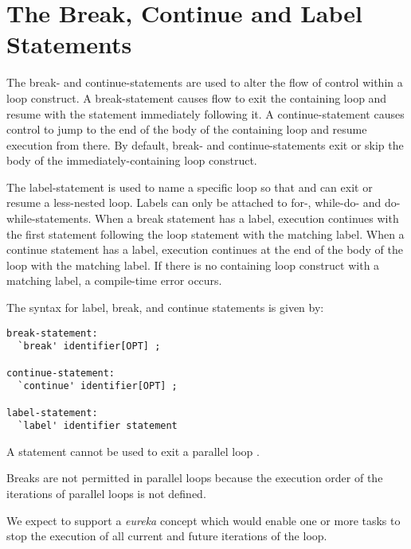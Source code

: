\pagebreak
\section{The Break, Continue and Label Statements}
\label{Label_Break_Continue}

The break- and continue-statements are used to alter the flow of control within a
loop construct.  A break-statement causes flow to exit the containing loop and
resume with the statement immediately following it.  A continue-statement causes
control to jump to the end of the body of the containing loop and resume
execution from there.  By default, break- and continue-statements exit
or skip the body of the immediately-containing loop construct.

The label-statement is used to name a specific loop so that 
and  can exit or resume a less-nested loop.
Labels can only be attached to for-, while-do- and do-while-statements.
When a break statement has a label, execution continues with the first statement
following the loop statement with the matching label.  When a continue statement
has a label, execution continues at the end of the body of the loop with the
matching label.  If there is no containing loop construct with a matching label,
a compile-time error occurs.

The syntax for label, break, and continue statements is given by:
\begin{syntax}
\begin{verbatim}
break-statement:
  `break' identifier[OPT] ;

continue-statement:
  `continue' identifier[OPT] ;

label-statement:
  `label' identifier statement
\end{verbatim}
\end{syntax}

A  statement cannot be used to exit a parallel loop .

\begin{rationale}
Breaks are not permitted in parallel loops because the execution order
of the iterations of parallel loops is not defined.
\end{rationale}

\begin{future}
We expect to support a \emph{eureka} concept which would enable one or
more tasks to stop the execution of all current and future iterations
of the loop.
\end{future}

